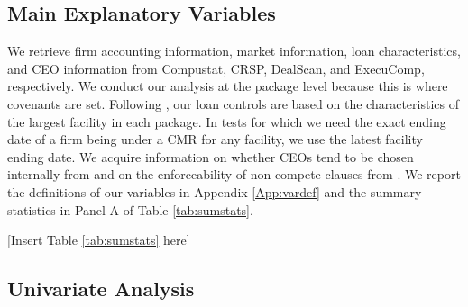\documentclass[a4paper,12pt]{article}
\begin{document}
\subsection{Main Explanatory Variables}

We retrieve firm accounting information, market information, loan characteristics, and CEO information from Compustat, CRSP, DealScan, and ExecuComp, respectively.
We conduct our analysis at the package level because this is where covenants are set.
Following \cite{Ivashina_2009}, our loan controls are based on the characteristics of the largest facility in each package.
In tests for which we need the exact ending date of a firm being under a CMR for any facility, we use the latest facility ending date.
We acquire information on whether CEOs tend to be chosen internally from \cite{Cremers_2014} and  on the enforceability of non-compete clauses from \cite{Garmaise_2011}.
We report the definitions of our variables in Appendix \ref{App:vardef} and the summary statistics in Panel A of Table \ref{tab:sumstats}.

\begin{center}
	[Insert Table \ref{tab:sumstats} here]
\end{center}



\label{section:inclusion}

\subsection{Univariate Analysis}
\label{section:inclusion_univariate}
\end{document}
